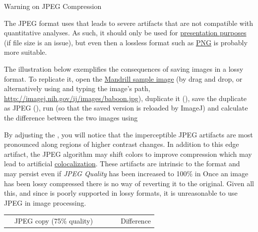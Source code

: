 \noindent {\small }
\begin{infobox}
\caption{\label{infobox:JpegAlert}Warning on JPEG Compression}


\noindent The JPEG format uses 
that leads to severe artifacts that are not compatible with quantitative
analyses. As such, it should only be used for \href{http://fiji.sc/wiki/index.php/IP_Principles\#Why_.28lossy.29_JPEGs_should_not_be_used_in_imaging}{presentation purposes}
(if file size is an issue), but even then a lossless format such as
\href{http://en.wikipedia.org/wiki/Portable_Network_Graphics}{PNG}
is probably more suitable.\medskip{}


\noindent The illustration below exemplifies the consequences of saving
images in a lossy format. To replicate it, open the \href{http://imagej.nih.gov/ij/images/baboon.jpg}{Mandrill sample image}
(by drag and drop, or alternatively using 
and typing the image's path, \url{http://imagej.nih.gov/ij/images/baboon.jpg}),
duplicate it (),
save the duplicate as JPEG (),
run 
(so that the saved version is reloaded by ImageJ) and calculate the
difference between the two images using \medskip{}


\noindent By adjusting the ,
you will notice that the imperceptible JPEG artifacts are most pronounced
along regions of higher contrast changes. In addition to this edge
artifact, the JPEG algorithm may shift colors to improve compression
which may lead to artificial \href{http://fiji.sc/wiki/index.php/Colocalization_Analysis}{colocalization}.
These artifacts are intrinsic to the format and may persist even if
\emph{JPEG Quality} has been increased to 100\% in 
Once an image has been lossy compressed there is no way of reverting
it to the original. Given all this, and since 
is poorly supported in lossy formats, it is unreasonable to use JPEG
in image processing. \bigskip{}


\noindent \begin{centering}
\begin{tabular}{>{\centering}p{}>{\centering}p{}>{\centering}p{}}
{\footnotesize Original\ \ \ \ \ \ \ } & {\footnotesize JPEG copy (75\% quality)\ \ \ } & {\footnotesize \ \ \ Difference}\tabularnewline
\end{tabular}
\par\end{centering}


\end{infobox}
